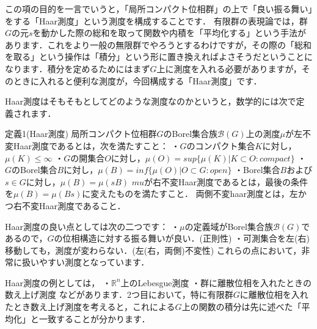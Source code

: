 

この項の目的を一言でいうと，「局所コンパクト位相群」の上で「良い振る舞い」をする「Haar測度」という測度を構成することです．
有限群の表現論では，群$G$の元$s$を動かした際の総和を取って関数や内積を「平均化する」という手法があります．これをより一般の無限群でやろうとするわけですが，その際の「総和を取る」という操作は「積分」という形に置き換えればよさそうだということになります．積分を定めるためにはまず$G$上に測度を入れる必要がありますが，そのときに入れると便利な測度が，今回構成する「Haar測度」です．

Haar測度はそもそもとしてどのような測度なのかというと，数学的には次で定義されます．

定義1(Haar測度)
局所コンパクト位相群$G$のBorel集合族$\mathscr{B}(G)$上の測度$\mu$が左不変Haar測度であるとは，次を満たすこと：
・$G$のコンパクト集合$K$に対し，$\mu(K) \le \infty$
・$G$の開集合$O$に対し，$\mu(O)=sup \{ \mu(K) | K \subset O \colon compact \}$
・$G$のBorel集合$B$に対し，$\mu(B)=inf \{ \mu(O) | O \subset G \colon open \}$
・Borel集合$B$および$s \in G$に対し，$\mu (B) = \mu (sB)$
$mu$が右不変Haar測度であるとは，最後の条件を$\mu (B) = \mu (Bs)$に変えたものを満たすこと．
両側不変haar測度とは，左かつ右不変Haar測度であること．

Haar測度の良い点としては次の二つです：
・$\mu$の定義域がBorel集合族$\mathscr{B}(G)$であるので，$G$の位相構造に対する振る舞いが良い．(正則性)
・可測集合を左(右)移動しても，測度が変わらない．(左(右，両側)不変性)
これらの点において，非常に扱いやすい測度となっています．

Haar測度の例としては，
・$\mathbb{R}^n$上のLebesgue測度
・群に離散位相を入れたときの数え上げ測度
などがあります．2つ目において，特に有限群$G$に離散位相を入れたとき数え上げ測度を考えると，これによる$G$上の関数の積分は先に述べた「平均化」と一致することが分かります．

